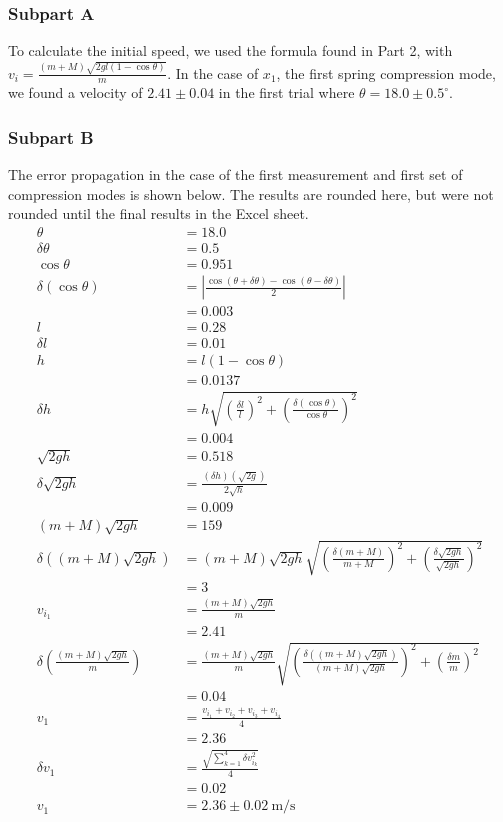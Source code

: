 \documentclass[8pt]{extarticle}
\newcommand{\plain}[1]{\textrm{#1}}
\begin{document}
{\subsubsection*{Subpart A}
To calculate the initial speed, we used the formula found in Part 2, with $v_{i} = \frac{(m+M)\sqrt{2gl(1-\cos\theta)}}{m}$. In the case of $x_1$, the first spring compression mode, we found a velocity of $2.41\pm 0.04$ in the first trial where $\theta = 18.0\pm 0.5^\circ$.
\subsubsection*{Subpart B}
The error propagation in the case of the first measurement and first set of compression modes is shown below. The results are rounded here, but were not rounded until the final results in the Excel sheet.
\begin{align*}
	\theta &= 18.0\\
	\delta\theta &= 0.5 \\
	\cos\theta &= 0.951\\
	\delta(\cos\theta) &= \left|\frac{\cos(\theta+\delta\theta) - \cos(\theta-\delta\theta)}{2}\right| \\
	&= 0.003\\
	l &= 0.28\\
	\delta l &= 0.01\\
	h &= l(1-\cos\theta) \\
	&= 0.0137\\
	\delta h &= h\sqrt{\left(\frac{\delta l}{l}\right)^2 + \left(\frac{\delta(\cos\theta)}{\cos\theta}\right)^2}\\
	&=0.004\\
	\sqrt{2gh} &= 0.518 \\
	\delta\sqrt{2gh} &= \frac{\left(\delta h\right)\left(\sqrt{2g}\right)}{2 \sqrt{h}} \\
	&= 0.009\\
	(m+M)\sqrt{2gh} &= 159\\
	\delta \left((m+M)\sqrt{2gh}\right) &= (m+M)\sqrt{2gh}\sqrt{\left(\frac{\delta(m+M)}{m+M}\right)^2 + \left(\frac{\delta \sqrt{2gh}}{\sqrt{2gh}} \right)^2} \\
	&= 3\\
	v_{i_1} &= \frac{(m+M)\sqrt{2gh}}{m} \\
	 &= 2.41\\
	\delta \left(\frac{(m+M)\sqrt{2gh}}{m}\right) &= \frac{(m+M)\sqrt{2gh}}{m}\sqrt{\left(\frac{\delta \left((m+M)\sqrt{2gh}\right)}{(m+M)\sqrt{2gh}}\right)^2 + \left(\frac{\delta m}{m}\right)^2} \\
	&= 0.04\\
	v_{1} &= \frac{v_{i_1} + v_{i_2} + v_{i_3} + v_{i_4}}{4}\\
	&= 2.36 \\
	\delta v_{1} &= \frac{\sqrt{\sum\limits_{k=1}^{4} \delta v_{i_{k}}^2}}{4} \\
	&= 0.02 \\
	v_{1} &= 2.36\pm 0.02~\plain{m/s}
\end{align*}
}
\end{document}
